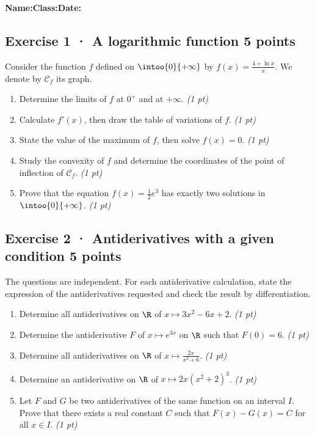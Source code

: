 \smallskip\textbf{Name:}\enspace\dotfill\quad\textbf{Class:}\enspace\dotfill\quad\textbf{Date:}\enspace\dotfill

\subsection*{Exercise 1 · A logarithmic function \hfill 5 points}Consider the function $f$ defined on $\intoo{0}{+\infty}$ by $f(x)=\frac{4+\ln x}x$. We denote by $\mathcal C_f$ its graph.

\begin{enumerate}

\item Determine the limits of $f$ at $0^+$ and at $+\infty$. \hfill\textit{(1 pt)}

\item Calculate $f' (x)$, then draw the table of variations of $f$. \hfill\textit{(1 pt)}

\item State the value of the maximum of $f$, then solve $f(x)=0$. \hfill\textit{(1 pt)}

\item Study the convexity of $f$ and determine the coordinates of the point of inflection of $\mathcal C_f$. \hfill\textit{(1 pt)}

\item Prove that the equation $f(x)=\frac12 e^{3}$ has exactly two solutions in $\intoo{0}{+\infty}$. \hfill\textit{(1 pt)}

\end{enumerate}

\subsection*{Exercise 2 · Antiderivatives with a given condition \hfill 5 points}The  questions are independent. For each antiderivative calculation, state the expression of the antiderivatives requested and check the result by differentiation.

\begin{enumerate}

\item Determine all antiderivatives on $\R$ of $x\mapsto 3x^2-6x+2$. \hfill\textit{(1 pt)}

\item Determine the antiderivative $F$ of $x\mapsto e^{3x}$ on $\R$ such that $F(0)=6$. \hfill\textit{(1 pt)}

\item Determine all antiderivatives on $\R$ of $x\mapsto\frac{2x}{x^2+6}$. \hfill\textit{(1 pt)}

\item Determine an antiderivative on $\R$ of $x\mapsto2x(x^2+2)^{3}$. \hfill\textit{(1 pt)}

\item Let $F$ and $G$ be two antiderivatives of the same function on an interval $I$. Prove that there exists a real constant $C$ such that $F(x)-G(x)=C$ for all $x\in I$. \hfill\textit{(1 pt)}

\end{enumerate}

